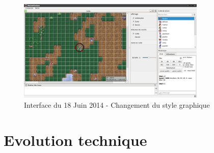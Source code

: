 \begin{figure}[h!]
	\centering
	\includegraphics[width=0.8\textwidth]{img/gui_history/2014_06_18_screen.png}
	\caption{Interface du 18 Juin 2014 - Changement du style graphique}
\end{figure}

\section{Evolution technique} %

